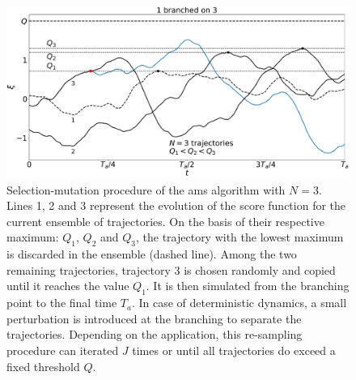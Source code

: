 \documentclass{jfm}
\begin{document}
\begin{figure}
  \centering
  \includegraphics[width=\linewidth]{illustr_AMS/illustr_AMS}
  \caption{\label{fig:illustr_AMS} Selection-mutation procedure of the \ac{ams} algorithm with $N=3$. Lines 1, 2 and 3 represent the evolution of the score function for the current ensemble of trajectories. On the basis of their respective maximum: $Q_1$, $Q_2$ and $Q_3$, the trajectory with the lowest maximum is discarded in the ensemble (dashed line). Among the two remaining trajectories, trajectory 3 is chosen randomly and copied until it reaches the value $Q_1$. It is then simulated from the branching point to the final time $T_a$. In case of deterministic dynamics, a small perturbation is introduced at the branching to separate the trajectories. Depending on the application, this re-sampling procedure can iterated $J$ times or until all trajectories do exceed a fixed threshold $Q$.}
\end{figure}
\end{document}
